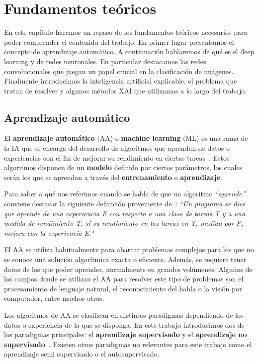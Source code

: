 \clearpage
\chapter{Fundamentos teóricos} \label{cap:ft}

En este capítulo haremos un repaso de los fundamentos teóricos necesarios para poder comprender el contenido del trabajo. En primer lugar presentamos el concepto de aprendizaje automático. A continuación hablaremos de qué es el deep learning y de redes neuronales. En particular destacamos las redes convolucionales que juegan un papel crucial en la clasificación de imágenes. Finalmente introducimos la inteligencia artificial explicable, el problema que tratan de resolver y algunos métodos XAI que utilizamos a lo largo del trabajo.

\section{Aprendizaje automático}

El \textbf{aprendizaje automático} (AA) o \textbf{machine learning} (ML) es una rama de la IA que se encarga del desarrollo de algoritmos que aprendan de datos o experiencias con el fin de mejorar su rendimiento en ciertas tareas~\cite{alpaydin_introduction_2010-1, PatternRecogLibro}. Estos algoritmos disponen de un \textbf{modelo} definido por ciertos parámetros, los cuales serán los que se aprendan a través del \textbf{entrenamiento} o \textbf{aprendizaje}.

Para saber a qué nos referimos cuando se habla de que un algoritmo \textit{``aprende''} conviene destacar la siguiente definición proveniente de~\cite{mitchell_machine_1997}: \textit{``Un programa se dice que aprende de una experiencia E con respecto a una clase de tareas T y a una medida de rendimiento T, si su rendimiento en las tareas en T, medido por P, mejora con la experiencia E."}

El AA se utiliza habitualmente para abarcar problemas complejos para los que no se conoce una solución algorítmica exacta o eficiente. Además, se requiere tener datos de los que poder aprender, normalmente en grandes volúmenes. Algunos de los campos donde se utilizan el AA para resolver este tipo de problemas son el procesamiento de lenguaje natural, el reconocimiento del habla o la visión por computador, entre muchos otros.

Los algoritmos de AA se clasifican en distintos paradigmas dependiendo de los datos o experiencia de la que se disponga. En este trabajo introducimos dos de los paradigmas principales: el \textbf{aprendizaje supervisado} y el \textbf{aprendizaje no supervisado}~\cite{Mostafa2012,Goodfellow-et-al-2016}. Existen otros paradigmas no relevantes para este trabajo como el aprendizaje semi supervisado o el autosupervisado.

